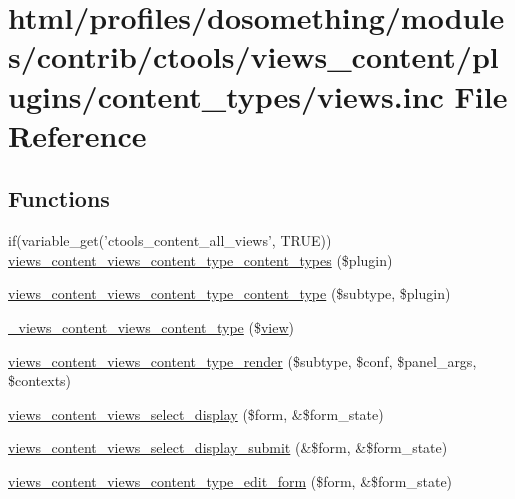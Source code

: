 \hypertarget{views__content_2plugins_2content__types_2views_8inc}{
\section{html/profiles/dosomething/modules/contrib/ctools/views\_\-content/plugins/content\_\-types/views.inc File Reference}
\label{views__content_2plugins_2content__types_2views_8inc}
}
\subsection*{Functions}
\begin{DoxyCompactItemize}
\item 
if(variable\_\-get('ctools\_\-content\_\-all\_\-views', TRUE)) \hyperlink{views__content_2plugins_2content__types_2views_8inc_a234ce12ad0884bd3818873ff5f9fbe89}{views\_\-content\_\-views\_\-content\_\-type\_\-content\_\-types} (\$plugin)
\item 
\hyperlink{views__content_2plugins_2content__types_2views_8inc_a6bfd28abb7482709261e1ccfcd1a7868}{views\_\-content\_\-views\_\-content\_\-type\_\-content\_\-type} (\$subtype, \$plugin)
\item 
\hyperlink{views__content_2plugins_2content__types_2views_8inc_ae650c241a17a33342ecaf29e21bc7e16}{\_\-views\_\-content\_\-views\_\-content\_\-type} (\$\hyperlink{classview}{view})
\item 
\hyperlink{views__content_2plugins_2content__types_2views_8inc_aefa426d99ad7d486e065540660f27d6f}{views\_\-content\_\-views\_\-content\_\-type\_\-render} (\$subtype, \$conf, \$panel\_\-args, \$contexts)
\item 
\hyperlink{views__content_2plugins_2content__types_2views_8inc_a846334132f0794ebac175d78df1e80bf}{views\_\-content\_\-views\_\-select\_\-display} (\$form, \&\$form\_\-state)
\item 
\hyperlink{views__content_2plugins_2content__types_2views_8inc_a5e2e282d12372207e80bb6a9606133ac}{views\_\-content\_\-views\_\-select\_\-display\_\-submit} (\&\$form, \&\$form\_\-state)
\item 
\hyperlink{views__content_2plugins_2content__types_2views_8inc_a5547efddaf36e1e7edc9b97ddd2986de}{views\_\-content\_\-views\_\-content\_\-type\_\-edit\_\-form} (\$form, \&\$form\_\-state)
\item 

\end{DoxyCompactItemize}

